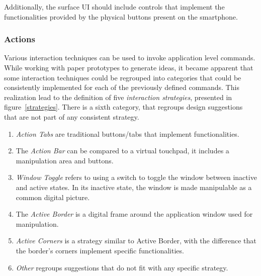 Additionally, the surface UI should include controls that implement the functionalities provided by the physical buttons present on the smartphone.

\subsubsection{Actions}

Various interaction techniques can be used to invoke application level commands.
While working with paper prototypes to generate ideas, it became apparent that some interaction techniques could be regrouped into categories that could be consistently implemented for each of the previously defined commands.
This realization lead to the definition of five \emph{interaction strategies}, presented in figure~\ref{strategies}.
There is a sixth category, that regroups design suggestions that are not part of any consistent strategy.

\begin{enumerate}
\item{\emph{Action Tabs} are traditional buttons/tabs that implement functionalities.}
\item{The \emph{Action Bar} can be compared to a virtual touchpad, it includes a manipulation area and buttons.}
\item{\emph{Window Toggle} refers to using a switch to toggle the window between inactive and active states. In its inactive state, the window is made manipulable as a common digital picture.}
\item{The \emph{Active Border} is a digital frame around the application window used for manipulation.}
\item{\emph{Active Corners} is a strategy similar to Active Border, with the difference that the border's corners implement specific functionalities.}
\item{\emph{Other} regroups suggestions that do not fit with any specific strategy.}
\end{enumerate}

